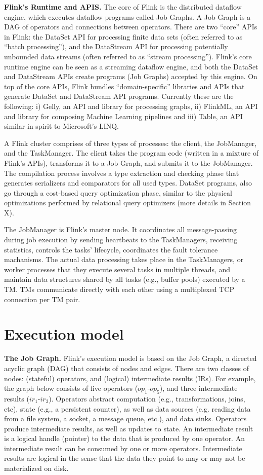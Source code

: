 \documentclass{sig-alternate}
\begin{document}
\textbf{Flink's Runtime and APIS.} The core of Flink is the distributed dataflow engine, which executes dataflow programs called Job Graphs. A Job Graph is a DAG of operators and connections between operators. There are two ``core'' APIs in Flink: the DataSet API for processing finite data sets (often referred to as ``batch processing''), and the DataStream API for processing potentially unbounded data streams (often referred to as ``stream processing''). Flink's core runtime engine can be seen as a streaming dataflow engine, and both the DataSet and DataStream APIs create programs (Job Graphs) accepted by this engine. On top of the core APIs, Flink bundles ``domain-specific'' libraries and APIs that generate DataSet and DataStream API programs. Currently these are the following: i) Gelly, an API and library for processing graphs, ii) FlinkML, an API and library for composing Machine Learning pipelines and iii) Table, an API similar in spirit to Microsoft's LINQ.

A Flink cluster comprises of three types of processes: the client, the JobManager, and the TaskManager. The client takes the program code (written in a mixture of Flink's APIs), transforms it to a Job Graph, and submits it to the JobManager. The compilation process involves a type extraction and checking phase that generates serializers and comparators for all used types. DataSet programs, also go through a cost-based query optimization phase, similar to the physical optimizations performed by relational query optimizers (more details in Section X).

The JobManager is Flink's master node. It coordinates all message-passing during job execution by sending heartbeats to the TaskManagers, receiving statistics, controls the tasks' lifecycle,  coordinates the fault tolerance machanisms. The actual data processing takes place in the TaskManagers, or worker processes that they execute several tasks in multiple threads, and maintain data structures shared by all tasks (e.g., buffer pools) executed by a TM. TMs communicate directly with each other using a multiplexed TCP connection per TM pair. 


\section{Execution model}

\textbf{The Job Graph.} Flink's execution model is based on the Job Graph, a directed acyclic graph (DAG) that consists of nodes and edges. There are two classes of nodes: (stateful) operators, and (logical) intermediate results (IRs). For example, the graph below consists of five operators ($op_1$-$op_5$), and three intermediate results ($ir_1$-$ir_3$). Operators abstract computation (e.g., transformations, joins, etc), state (e.g., a persistent counter), as well as data sources (e.g. reading data from a file system, a socket, a message queue, etc.), and data sinks. Operators produce intermediate results, as well as updates to state. An intermediate result is a logical handle (pointer) to the data that is produced by one operator. An intermediate result can be consumed by one or more operators. Intermediate results are logical in the sense that the data they point to may or may not be materialized on disk.
\end{document}

